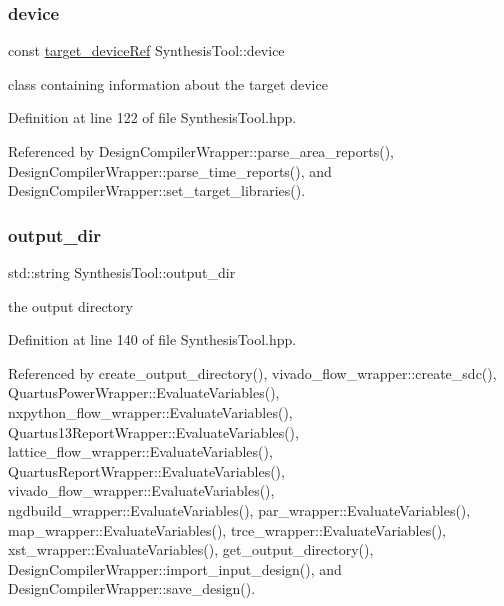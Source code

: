 \mbox{\label{classSynthesisTool_a07bf37421c6cff80ba70682ea2b2e3ae}} 
\subsubsection{\texorpdfstring{device}{device}}
{\footnotesize\ttfamily const \hyperlink{target__device_8hpp_acedb2b7a617e27e6354a8049fee44eda}{target\+\_\+device\+Ref} Synthesis\+Tool\+::device\hspace{0.3cm}{\ttfamily [protected]}}



class containing information about the target device 



Definition at line 122 of file Synthesis\+Tool.\+hpp.



Referenced by Design\+Compiler\+Wrapper\+::parse\+\_\+area\+\_\+reports(), Design\+Compiler\+Wrapper\+::parse\+\_\+time\+\_\+reports(), and Design\+Compiler\+Wrapper\+::set\+\_\+target\+\_\+libraries().

\mbox{\label{classSynthesisTool_a285793f6f539ed6f049c375cdb68d607}} 
\subsubsection{\texorpdfstring{output\+\_\+dir}{output\_dir}}
{\footnotesize\ttfamily std\+::string Synthesis\+Tool\+::output\+\_\+dir\hspace{0.3cm}{\ttfamily [protected]}}



the output directory 



Definition at line 140 of file Synthesis\+Tool.\+hpp.



Referenced by create\+\_\+output\+\_\+directory(), vivado\+\_\+flow\+\_\+wrapper\+::create\+\_\+sdc(), Quartus\+Power\+Wrapper\+::\+Evaluate\+Variables(), nxpython\+\_\+flow\+\_\+wrapper\+::\+Evaluate\+Variables(), Quartus13\+Report\+Wrapper\+::\+Evaluate\+Variables(), lattice\+\_\+flow\+\_\+wrapper\+::\+Evaluate\+Variables(), Quartus\+Report\+Wrapper\+::\+Evaluate\+Variables(), vivado\+\_\+flow\+\_\+wrapper\+::\+Evaluate\+Variables(), ngdbuild\+\_\+wrapper\+::\+Evaluate\+Variables(), par\+\_\+wrapper\+::\+Evaluate\+Variables(), map\+\_\+wrapper\+::\+Evaluate\+Variables(), trce\+\_\+wrapper\+::\+Evaluate\+Variables(), xst\+\_\+wrapper\+::\+Evaluate\+Variables(), get\+\_\+output\+\_\+directory(), Design\+Compiler\+Wrapper\+::import\+\_\+input\+\_\+design(), and Design\+Compiler\+Wrapper\+::save\+\_\+design().

